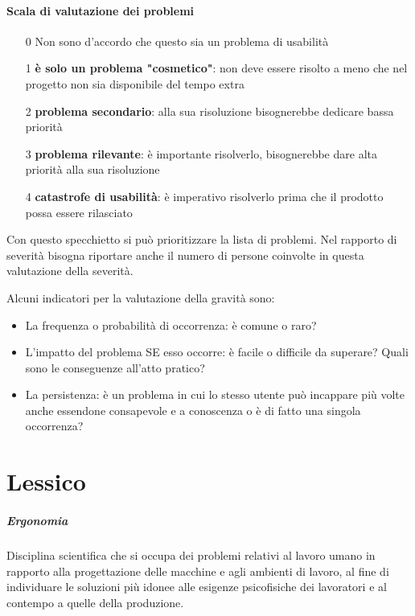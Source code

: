 \documentclass[11pt,a4paper]{book}
\begin{document}
\subsubsection{Scala di valutazione dei problemi}
\begin{itemize}
	\item[0] Non sono d'accordo che questo sia un problema di usabilità
	\item[1] \textbf{è solo un problema "cosmetico"}: non deve essere risolto a meno che nel progetto non sia disponibile del tempo extra 
	\item[2] \textbf{problema secondario}: alla sua risoluzione bisognerebbe dedicare bassa priorità
	\item[3] \textbf{problema rilevante}: è importante risolverlo, bisognerebbe dare alta priorità alla sua risoluzione
	\item[4] \textbf{catastrofe di usabilità}: è imperativo risolverlo prima che il prodotto possa essere rilasciato
\end{itemize}
Con questo specchietto si può prioritizzare la lista di problemi. Nel rapporto di severità bisogna riportare anche il numero di persone coinvolte in questa valutazione della severità.

Alcuni indicatori per la valutazione della gravità sono:
\begin{itemize}
	\item La frequenza o probabilità di occorrenza: è comune o raro?
	\item L'impatto del problema SE esso occorre: è facile o difficile da superare? Quali sono le conseguenze all'atto pratico?
	\item La persistenza: è un problema in cui lo stesso utente può incappare più volte anche essendone consapevole e a conoscenza o è di fatto una singola occorrenza?
\end{itemize}


\chapter{Lessico}
\paragraph{Ergonomia}
Disciplina scientifica che si occupa dei problemi relativi al lavoro umano in rapporto alla progettazione delle macchine e agli ambienti di lavoro, al fine di individuare le soluzioni più idonee alle esigenze psicofisiche dei lavoratori e al contempo a quelle della produzione.
\end{document}
